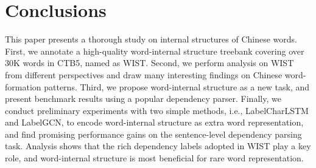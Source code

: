 
\section{Conclusions}

This paper presents a thorough study on internal structures of Chinese words. 
First, %
we annotate a high-quality word-internal structure treebank covering over 30K words in CTB5, named as WIST. 
Second, we perform analysis on WIST from different perspectives and draw many interesting findings on Chinese word-formation patterns. 
Third, we propose word-internal structure as a new task, and present benchmark results using a popular dependency parser. 
Finally, we 
conduct preliminary experiments with two simple methods, i.e., LabelCharLSTM and LabelGCN, to encode word-internal structure as extra word representation, and find promising performance gains on the sentence-level dependency parsing task. 
Analysis shows that the rich dependency labels adopted in WIST play a key role, and word-internal structure is most beneficial for rare word representation. 











